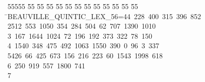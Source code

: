 %
%
\begin{tabbing}
55555 \= 55 \= 55 \= 55 \= 55 \= 55 \= 55 \= 55 \= 55 \= 55 \= 55 \= 55 \= 55 \= \>BEAUVILLE\_QUINTIC\_LEX\_56=44\ 228\ 400\ 315\ 396\ 852\ \\[0pt]
2\>512\ 553\ 1050\ 354\ 284\ 504\ 62\ 707\ 1390\ 1010\ \\[0pt]
3\ 167\ 1644\ 1024\ 72\ 196\ 192\ 373\ 322\ 78\ 150\ \\[0pt]
4\ 1540\ 348\ 475\ 492\ 1063\ 1550\ 390\ 0\ 96\ 3\ 337\ \\[0pt]
5\>426\ 66\ 425\ 673\ 156\ 216\ 223\ 60\ 1543\ 1998\ 618\ \\[0pt]
6\ 250\ 919\ 557\ 1800\ 741\\[0pt]
7\>\end{tabbing}
